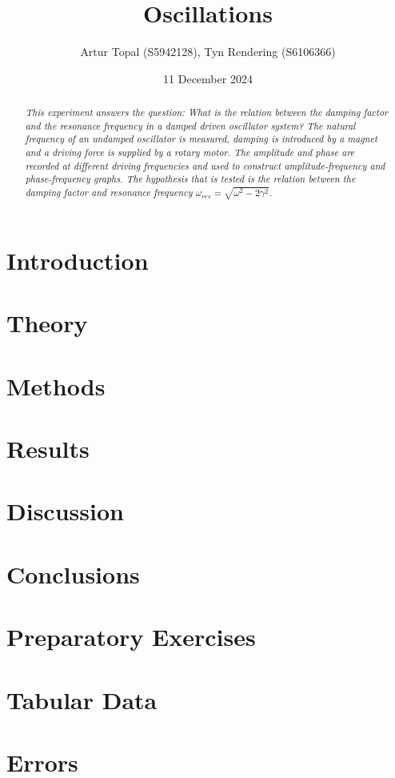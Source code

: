 \documentclass[a4paper,12pt]{article}
\title{Oscillations}
\author{Artur Topal (S5942128), Tyn Rendering (S6106366)}
\date{11 December 2024}
\begin{document}
\begin{titlingpage}
  \centering
  \maketitle
  \vspace{2cm}
  \begin{abstract}
  \textit{This experiment answers the question: What is the relation between the damping factor and the resonance frequency in a damped driven oscillator system? The natural frequency of an undamped oscillator is measured, damping is introduced by a magnet and a driving force is supplied by a rotary motor. The amplitude and phase are recorded at different driving frequencies and used to construct amplitude-frequency and phase-frequency graphs. The hypothesis that is tested is the relation between the damping factor and resonance frequency $\omega_{res} = \sqrt{\omega^2 - 2\gamma^2}$.}
\end{abstract}

\end{titlingpage}

\break
\tableofcontents
\break
\section{Introduction}


\section{Theory}\label{sec:theory}


\section{Methods}


\section{Results}


\section{Discussion}


\section{Conclusions}


\appendix
\section{Preparatory Exercises}\label{appendix:preps}

 
\section{Tabular Data}\label{appendix:data}


\section{Errors}\label{appendix:errors}

\end{document}

